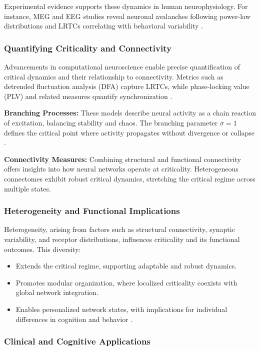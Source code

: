 Experimental evidence supports these dynamics in human neurophysiology. For instance, MEG and EEG studies reveal neuronal avalanches following power-law distributions and LRTCs correlating with behavioral variability \cite{palva2013scaling}.

\subsubsection*{Quantifying Criticality and Connectivity}

Advancements in computational neuroscience enable precise quantification of critical dynamics and their relationship to connectivity. Metrics such as detrended fluctuation analysis (DFA) capture LRTCs, while phase-locking value (PLV) and related measures quantify synchronization \cite{lobier2017functional}.

\textbf{Branching Processes:} These models describe neural activity as a chain reaction of excitation, balancing stability and chaos. The branching parameter $\sigma = 1$ defines the critical point where activity propagates without divergence or collapse \cite{kinouchi2006optimal}.

\textbf{Connectivity Measures:} Combining structural and functional connectivity offers insights into how neural networks operate at criticality. Heterogeneous connectomes exhibit robust critical dynamics, stretching the critical regime across multiple states.

\subsubsection*{Heterogeneity and Functional Implications}

Heterogeneity, arising from factors such as structural connectivity, synaptic variability, and receptor distributions, influences criticality and its functional outcomes. This diversity:
\begin{itemize}
    \item Extends the critical regime, supporting adaptable and robust dynamics.
    \item Promotes modular organization, where localized criticality coexists with global network integration.
    \item Enables personalized network states, with implications for individual differences in cognition and behavior \cite{gross2019meg}.
\end{itemize}

\subsubsection*{Clinical and Cognitive Applications}

